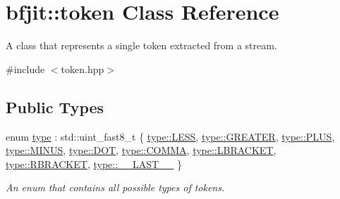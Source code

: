 \hypertarget{classbfjit_1_1token}{}\section{bfjit\+:\+:token Class Reference}
\label{classbfjit_1_1token}


A class that represents a single token extracted from a stream.  




{\ttfamily \#include $<$token.\+hpp$>$}

\subsection*{Public Types}
\begin{DoxyCompactItemize}
\item 
enum \hyperlink{classbfjit_1_1token_a2486a3e583fb48f3863c4eb5c32cdd96}{type} \+: std\+::uint\+\_\+fast8\+\_\+t \{ \newline
\hyperlink{classbfjit_1_1token_a2486a3e583fb48f3863c4eb5c32cdd96a1798e8c3621ca53d9e3a80d257306000}{type\+::\+L\+E\+SS}, 
\hyperlink{classbfjit_1_1token_a2486a3e583fb48f3863c4eb5c32cdd96ae7e72355289e404b762d4cf88824d23b}{type\+::\+G\+R\+E\+A\+T\+ER}, 
\hyperlink{classbfjit_1_1token_a2486a3e583fb48f3863c4eb5c32cdd96a883acd43c77567e1c3baced84ccf6ed7}{type\+::\+P\+L\+US}, 
\hyperlink{classbfjit_1_1token_a2486a3e583fb48f3863c4eb5c32cdd96affc0d9b54a1fe677c4c9e6b050e67c81}{type\+::\+M\+I\+N\+US}, 
\newline
\hyperlink{classbfjit_1_1token_a2486a3e583fb48f3863c4eb5c32cdd96a40679521b5da0954b705341a2859f782}{type\+::\+D\+OT}, 
\hyperlink{classbfjit_1_1token_a2486a3e583fb48f3863c4eb5c32cdd96a4d9b3e9fc12849d060371eb65154c751}{type\+::\+C\+O\+M\+MA}, 
\hyperlink{classbfjit_1_1token_a2486a3e583fb48f3863c4eb5c32cdd96ad500138bf8f61d4b0b80413f4b76a82a}{type\+::\+L\+B\+R\+A\+C\+K\+ET}, 
\hyperlink{classbfjit_1_1token_a2486a3e583fb48f3863c4eb5c32cdd96a270adbd249f9997adc3208e92a57e066}{type\+::\+R\+B\+R\+A\+C\+K\+ET}, 
\newline
\hyperlink{classbfjit_1_1token_a2486a3e583fb48f3863c4eb5c32cdd96a62bd5a4afef994ba01e631cbf00f85be}{type\+::\+\_\+\+\_\+\+L\+A\+S\+T\+\_\+\+\_\+}
 \}\begin{DoxyCompactList}\small\item\em An enum that contains all possible types of tokens. \end{DoxyCompactList}
\end{DoxyCompactItemize}
